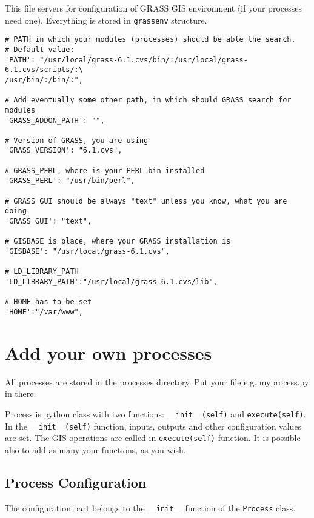 \documentclass[a4paper,11pt]{article}
\begin{document}
    This file servers for configuration of GRASS GIS environment (if your
    processes need one). Everything is stored in \texttt{grassenv} structure. 
     

    \begin{verbatim}
# PATH in which your modules (processes) should be able the search.
# Default value:
'PATH': "/usr/local/grass-6.1.cvs/bin/:/usr/local/grass-6.1.cvs/scripts/:\
/usr/bin/:/bin/:",

# Add eventually some other path, in which should GRASS search for modules
'GRASS_ADDON_PATH': "",

# Version of GRASS, you are using
'GRASS_VERSION': "6.1.cvs",

# GRASS_PERL, where is your PERL bin installed
'GRASS_PERL': "/usr/bin/perl",

# GRASS_GUI should be always "text" unless you know, what you are doing
'GRASS_GUI': "text",

# GISBASE is place, where your GRASS installation is
'GISBASE': "/usr/local/grass-6.1.cvs",

# LD_LIBRARY_PATH
'LD_LIBRARY_PATH':"/usr/local/grass-6.1.cvs/lib",

# HOME has to be set
'HOME':"/var/www",
    \end{verbatim}

    
    \section{Add your own processes}
     
    All processes are stored in the processes directory. Put your file
    e.g. myprocess.py in there.
     

     
    Process is python class with two functions: \texttt{\_\_init\_\_(self)}
    and \texttt{execute(self)}.
    In the \texttt{\_\_init\_\_(self)} function, inputs, outputs and other configuration values are set. The GIS operations 
    are called in \texttt{execute(self)}  function. It is possible also to add as many your functions, as you wish.
     

    \subsection{Process Configuration}
     
    The configuration part belongs to the \texttt{\_\_init\_\_} function of the	\texttt{Process} class.
     
\end{document}
